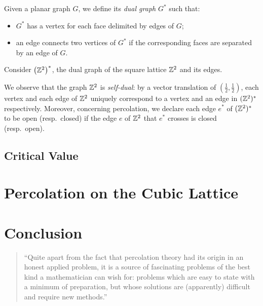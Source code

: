 \documentclass[a4paper, 12pt]{article}
\begin{document}
\begin{defn}
Given a planar graph $G$, we define its \textit{dual graph} $G^*$ such that:
\begin{itemize}
    \item $G^*$ has a vertex for each face delimited by edges of $G$;
    \item an edge connects two vertices of $G^*$ if the corresponding faces are separated by an edge of $G$.
\end{itemize}
\end{defn}
\begin{ex}
Consider $\left(\mathbb{Z}^2\right)^*$, the dual graph of the square lattice $\mathbb{Z}^2$ and its edges.


We observe that the graph $\mathbb{Z}^2$ is \textit{self-dual}: by a vector translation of $(\frac{1}{2}, \frac{1}{2})$, each vertex and each edge of $\mathbb{Z}^2$ uniquely correspond to a vertex and an edge in $(\mathbb{Z}^2)^*$ respectively. Moreover, concerning percolation, we declare each edge $e^*$ of $(\mathbb{Z}^2)^*$ to be open (resp.\ closed) if the edge $e$ of $\mathbb{Z}^2$ that $e^*$ crosses is closed (resp.\ open).
\end{ex}



\subsection{Critical Value}

\section{Percolation on the Cubic Lattice}


\section{Conclusion}
\begin{quotation}
``Quite apart from the fact that percolation theory had its origin in an honest applied problem, it is a source of fascinating problems of the best kind a mathematician can wish for: problems which are easy to state with a minimum of preparation, but whose solutions are (apparently) difficult and require new methods.''
\end{quotation}

\nocite{*}
\printbibliography
\end{document}
